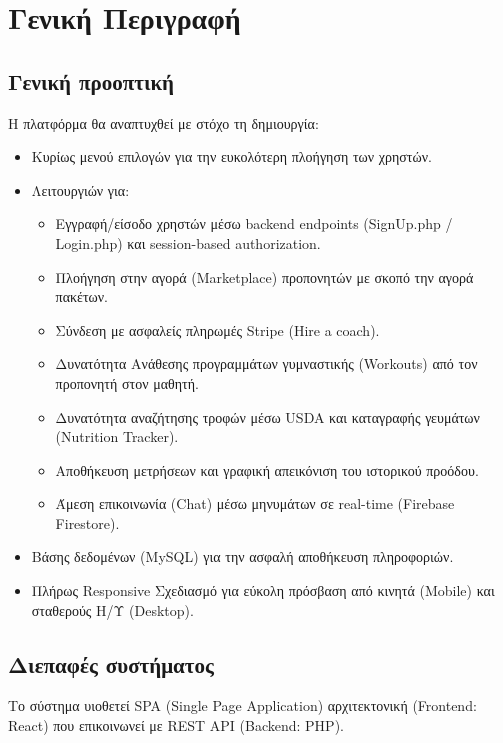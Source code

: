 \documentclass[12pt,a4paper]{report}
\begin{document}
\newpage

\section{Γενική Περιγραφή}

\subsection{Γενική προοπτική}
Η πλατφόρμα θα αναπτυχθεί με στόχο τη δημιουργία:
\begin{itemize}
    \item Κυρίως μενού επιλογών για την ευκολότερη πλοήγηση των χρηστών.
    \item Λειτουργιών για:
    \begin{itemize}
        \item Εγγραφή/είσοδο χρηστών μέσω backend endpoints (\textenglish{SignUp.php / Login.php}) και session-based authorization.
        \item Πλοήγηση στην αγορά (Marketplace) προπονητών με σκοπό την αγορά πακέτων.
        \item Σύνδεση με ασφαλείς πληρωμές Stripe (Hire a coach).
        \item Δυνατότητα Ανάθεσης προγραμμάτων γυμναστικής (Workouts) από τον προπονητή στον μαθητή.
        \item Δυνατότητα αναζήτησης τροφών μέσω USDA και καταγραφής γευμάτων (Nutrition Tracker).
        \item Αποθήκευση μετρήσεων και γραφική απεικόνιση του ιστορικού προόδου.
        \item Άμεση επικοινωνία (Chat) μέσω μηνυμάτων σε real-time (Firebase Firestore).
    \end{itemize}
    \item Βάσης δεδομένων (MySQL) για την ασφαλή αποθήκευση πληροφοριών.
    \item Πλήρως Responsive Σχεδιασμό για εύκολη πρόσβαση από κινητά (Mobile) και σταθερούς Η/Υ (Desktop).
\end{itemize}

\subsection{Διεπαφές συστήματος}
Το σύστημα υιοθετεί SPA (Single Page Application) αρχιτεκτονική (Frontend: React) που επικοινωνεί με REST API (Backend: PHP). 
\end{document}
